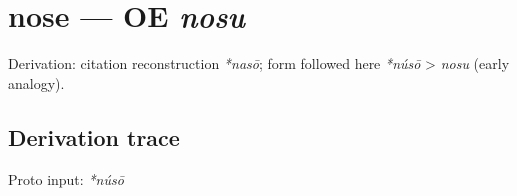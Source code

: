 \documentclass[
  british,
  a4paper,
  openany]{book}
\providecommand{\texorpdfstring}[2]{#1}
\begin{document}
\section{\texorpdfstring{nose --- OE
\emph{nosu}}{nose --- OE nosu}}\label{nose-oe-nosu}


Derivation: citation reconstruction \emph{*nasō}; form followed here
\emph{*núsō} \textgreater{} \emph{nosu} (early analogy).

\subsection{Derivation trace}\label{derivation-trace-92}

Proto input: \emph{*núsō}

\begingroup
\setlength{\fboxsep}{6pt}
\end{document}
